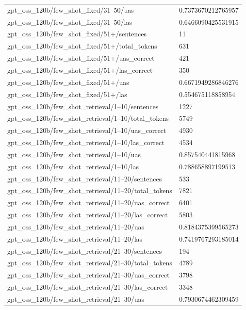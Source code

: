 \begin{tabular}{ll}
gpt\_oss\_120b/few\_shot\_fixed/31–50/uas & 0.7373670212765957 \\
gpt\_oss\_120b/few\_shot\_fixed/31–50/las & 0.6466090425531915 \\
gpt\_oss\_120b/few\_shot\_fixed/51+/sentences & 11 \\
gpt\_oss\_120b/few\_shot\_fixed/51+/total\_tokens & 631 \\
gpt\_oss\_120b/few\_shot\_fixed/51+/uas\_correct & 421 \\
gpt\_oss\_120b/few\_shot\_fixed/51+/las\_correct & 350 \\
gpt\_oss\_120b/few\_shot\_fixed/51+/uas & 0.6671949286846276 \\
gpt\_oss\_120b/few\_shot\_fixed/51+/las & 0.554675118858954 \\
gpt\_oss\_120b/few\_shot\_retrieval/1–10/sentences & 1227 \\
gpt\_oss\_120b/few\_shot\_retrieval/1–10/total\_tokens & 5749 \\
gpt\_oss\_120b/few\_shot\_retrieval/1–10/uas\_correct & 4930 \\
gpt\_oss\_120b/few\_shot\_retrieval/1–10/las\_correct & 4534 \\
gpt\_oss\_120b/few\_shot\_retrieval/1–10/uas & 0.857540441815968 \\
gpt\_oss\_120b/few\_shot\_retrieval/1–10/las & 0.788658897199513 \\
gpt\_oss\_120b/few\_shot\_retrieval/11–20/sentences & 533 \\
gpt\_oss\_120b/few\_shot\_retrieval/11–20/total\_tokens & 7821 \\
gpt\_oss\_120b/few\_shot\_retrieval/11–20/uas\_correct & 6401 \\
gpt\_oss\_120b/few\_shot\_retrieval/11–20/las\_correct & 5803 \\
gpt\_oss\_120b/few\_shot\_retrieval/11–20/uas & 0.8184375399565273 \\
gpt\_oss\_120b/few\_shot\_retrieval/11–20/las & 0.7419767293185014 \\
gpt\_oss\_120b/few\_shot\_retrieval/21–30/sentences & 194 \\
gpt\_oss\_120b/few\_shot\_retrieval/21–30/total\_tokens & 4789 \\
gpt\_oss\_120b/few\_shot\_retrieval/21–30/uas\_correct & 3798 \\
gpt\_oss\_120b/few\_shot\_retrieval/21–30/las\_correct & 3348 \\
gpt\_oss\_120b/few\_shot\_retrieval/21–30/uas & 0.7930674462309459 \\

\end{tabular}
